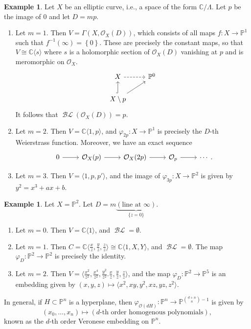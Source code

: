 \documentclass[10pt,letterpaper,cm]{nupset}
\theoremstyle{definition}
\newtheorem{exmp}[defn]{Example}
\theoremstyle{theorem}
\theoremstyle{remark}
\newcommand{\C}{\mathbb C}
\renewcommand{\O}{\mathcal O}
\renewcommand{\P}{\mathbb P}
\newcommand{\1}{\mathbb{1}}
\newcommand{\0}{\vec 0}
\DeclareMathOperator{\BL}{\mathcal{BL}}
\newcommand{\be}{\begin{enumerate}}
\newcommand{\ee}{\end{enumerate}}
\begin{document}
\begin{exmp}
Let $X$ be an elliptic curve, i.e., a space of the form $\C/\Lambda$. Let $p$ be the image of $0$ and let $D = mp$. 
\be
\item Let $m =1$. Then $V = \Gamma\left(X, \O_X(D)\right)$, which consists of all maps $f: X \to \P^1$ such that $f^{-1}\left(\infty\right) = \left\{0\right\}$. These are precisely the constant maps, so that $V \cong \C\langle s\rangle$ where $s$ is a holomorphic section of $\O_X(D)$ vanishing at $p$ and is meromorphic on $\O_X$.
\[
\begin{tikzcd}
X \arrow[r, dashed]                     & \P^0 \\
X\setminus p \arrow[u, hook] \arrow[ru] &     
\end{tikzcd}
\]
It follows that  $\BL\left(\O_X(D)\right) =p$.
\item Let $m=2$. Then $V= \C\langle 1, p\rangle$, and $\varphi_{2p} : X \to \P^1$ is precisely the $D$-th Weierstrass function. Moreover, we have an exact sequence
\[
\begin{tikzcd}
0 \arrow[r] & \O_X(p) \arrow[r] & \O_X(2p) \arrow[r] & \O_p \arrow[r] & \cdots
\end{tikzcd}.
\]
\item Let $m=3$. Then $V = \langle 1, p, p'\rangle$, and the image of $\varphi_{3p} :X \to \P^2$ is given by $y^2 = x^3+ax+b$. 
\ee
\end{exmp}

\begin{exmp} Let $X = \P^2$. Let $D= m\underbrace{\left(\text{line at }\infty\right)}_{\{z=0\}}$.
\be
\item Let $m=0$. Then $V = \C\langle 1\rangle$, and $\BL= \emptyset$.
\item Let $m=1$. Then $C = \C\langle \frac{x}{z}, \frac{y}{z}, \frac{z}{z}\rangle \cong \C\langle 1, X, Y\rangle$, and $\BL = \emptyset$. The map $\varphi_D : \P^2 \to \P^2$ is precisely the identity. 
\item Let $m=2$. Then $V = \langle \frac{x^2}{z^2}, \frac{x^4}{z^2}, \frac{y^2}{z^2}. \frac{x}{z}, \frac{y}{z}, \frac{z}{z}\rangle$, and the map $\varphi_D : \P^2 \to \P^5$ is an embedding given by $\left(x,y,z\right) \mapsto \langle x^2, xy, y^2, xz, yz, z^2\rangle$.
\ee
\end{exmp}

In general, if $H\subset \P^n$ is a hyperplane, then $\varphi_{\O\left(d{H}\right)} : \P^n \to \P^{{{d+n}\choose n} -1}$ is given by $$\left(x_0, \ldots, x_n\right) \mapsto \left(d\text{-th order homogenous polynomials}\right),$$  known as the $d$-th order Veronese embedding on $\P^n$.
\end{document}
